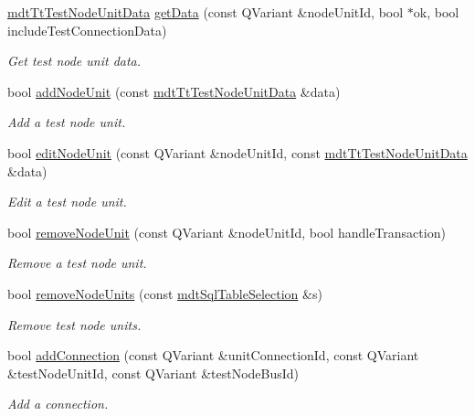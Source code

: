 \begin{DoxyCompactItemize}
\hyperlink{classmdt_tt_test_node_unit_data}{mdt\-Tt\-Test\-Node\-Unit\-Data} \hyperlink{classmdt_tt_test_node_unit_a155c09aa98d1b7fd00faee04abe0cf60}{get\-Data} (const Q\-Variant \&node\-Unit\-Id, bool $\ast$ok, bool include\-Test\-Connection\-Data)
\begin{DoxyCompactList}\small\item\em Get test node unit data. \end{DoxyCompactList}\item 
bool \hyperlink{classmdt_tt_test_node_unit_af613499d272edb4805d8151aafd6d195}{add\-Node\-Unit} (const \hyperlink{classmdt_tt_test_node_unit_data}{mdt\-Tt\-Test\-Node\-Unit\-Data} \&data)
\begin{DoxyCompactList}\small\item\em Add a test node unit. \end{DoxyCompactList}\item 
bool \hyperlink{classmdt_tt_test_node_unit_ab7b6cbf0c8d4fb6d9495216e946571d3}{edit\-Node\-Unit} (const Q\-Variant \&node\-Unit\-Id, const \hyperlink{classmdt_tt_test_node_unit_data}{mdt\-Tt\-Test\-Node\-Unit\-Data} \&data)
\begin{DoxyCompactList}\small\item\em Edit a test node unit. \end{DoxyCompactList}\item 
bool \hyperlink{classmdt_tt_test_node_unit_a6801e6741dd444e412ebc58fbef765c6}{remove\-Node\-Unit} (const Q\-Variant \&node\-Unit\-Id, bool handle\-Transaction)
\begin{DoxyCompactList}\small\item\em Remove a test node unit. \end{DoxyCompactList}\item 
bool \hyperlink{classmdt_tt_test_node_unit_a6f4aca17153ad6dea6250907ab9ff194}{remove\-Node\-Units} (const \hyperlink{classmdt_sql_table_selection}{mdt\-Sql\-Table\-Selection} \&s)
\begin{DoxyCompactList}\small\item\em Remove test node units. \end{DoxyCompactList}\item 
bool \hyperlink{classmdt_tt_test_node_unit_ae86c6774be2b7bd887912702eb0b4ed2}{add\-Connection} (const Q\-Variant \&unit\-Connection\-Id, const Q\-Variant \&test\-Node\-Unit\-Id, const Q\-Variant \&test\-Node\-Bus\-Id)
\begin{DoxyCompactList}\small\item\em Add a connection. \end{DoxyCompactList}\item 

\end{DoxyCompactItemize}
